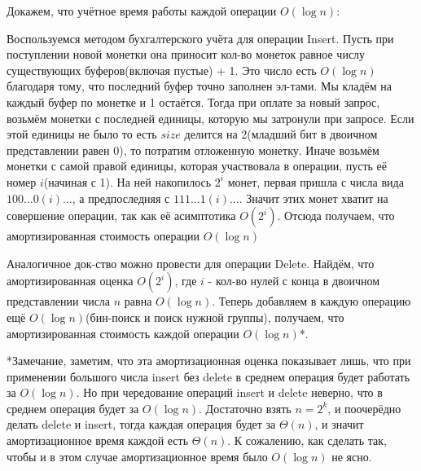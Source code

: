 \documentclass[12pt]{article}
\begin{document}
Докажем, что учётное время работы каждой операции $O(\log n)$:

Воспользуемся методом бухгалтерского учёта для операции Insert. 
Пусть при поступлении новой монетки она приносит кол-во монеток равное числу существующих буферов(включая пустые) + 1.
Это число есть $O(\log n)$ благодаря тому, что последний буфер точно заполнен эл-тами.
Мы кладём на каждый буфер по монетке и 1 остаётся.
Тогда при оплате за новый запрос, возьмём монетки с последней единицы, которую мы затронули при запросе.
Если этой единицы не было то есть $size$ делится на 2(младший бит в двоичном представлении равен 0), то потратим отложенную монетку. 
Иначе возьмём монетки с самой правой единицы, которая участвовала в операции, пусть её номер $i$(начиная с 1).
На ней накопилось $2^{i}$ монет, первая пришла с числа вида $100...0(i)...$, а предпоследняя с $111...1(i)...$. 
Значит этих монет хватит на совершение операции, так как её асимптотика $O(2^{i})$.
Отсюда получаем, что амортизированная стоимость операции $O(\log n)$

Аналогичное док-ство можно провести для операции Delete.
Найдём, что амортизированная оценка $O(2^{i})$, 
где $i$ - кол-во нулей с конца в двоичном представлении числа $n$ равна $O(\log n)$.
Теперь добавляем в каждую операцию ещё $O(\log n)$(бин-поиск и поиск нужной группы),
получаем, что амортизированная стоимость каждой операции $O(\log n)$*.

*Замечание, заметим, что эта амортизационная оценка показывает лишь, 
что при применении большого числа insert без delete в среднем операция будет работать за $O(\log n)$.
Но при чередование операций insert и delete неверно, что в среднем операция будет за $O(\log n)$.
Достаточно взять $n = 2^{k}$, и поочерёдно делать delete и insert, тогда каждая операция будет за $\Theta(n)$,
и значит амортизационное время каждой есть $\Theta(n)$. 
К сожалению, как сделать так, чтобы и в этом случае амортизационное время было $O(\log n)$ не ясно.
\end{document}
